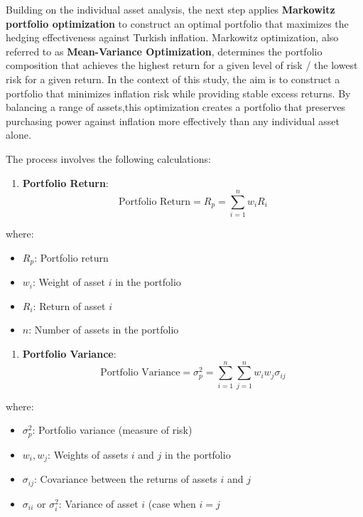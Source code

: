 \documentclass[
]{article}
\providecommand{\tightlist}{%
  \setlength{\itemsep}{0pt}\setlength{\parskip}{0pt}}
\begin{document}
Building on the individual asset analysis, the next step applies
\textbf{Markowitz portfolio optimization} to construct an optimal
portfolio that maximizes the hedging effectiveness against Turkish
inflation. Markowitz optimization, also referred to as
\textbf{Mean-Variance Optimization}, determines the portfolio
composition that achieves the highest return for a given level of risk /
the lowest risk for a given return. In the context of this study, the
aim is to construct a portfolio that minimizes inflation risk while
providing stable excess returns. By balancing a range of assets,this
optimization creates a portfolio that preserves purchasing power against
inflation more effectively than any individual asset alone.

The process involves the following calculations:

\begin{enumerate}
\def\labelenumi{\arabic{enumi}.}
\tightlist
\item
  \textbf{Portfolio Return}: \[
  \text{Portfolio Return} = R_p = \sum_{i=1}^{n} w_i R_i
  \]
\end{enumerate}

where:

\begin{itemize}
\tightlist
\item
  \(R_p\): Portfolio return
\item
  \(w_i\): Weight of asset \(i\) in the portfolio
\item
  \(R_i\): Return of asset \(i\)
\item
  \(n\): Number of assets in the portfolio
\end{itemize}

\begin{enumerate}
\def\labelenumi{\arabic{enumi}.}
\setcounter{enumi}{1}
\tightlist
\item
  \textbf{Portfolio Variance}: \[
  \text{Portfolio Variance} = \sigma_p^2 = \sum_{i=1}^{n} \sum_{j=1}^{n} w_i w_j \sigma_{ij}
  \]
\end{enumerate}

where:

\begin{itemize}
\tightlist
\item
  \(\sigma_p^2\): Portfolio variance (measure of risk)
\item
  \(w_i, w_j\): Weights of assets \(i\) and \(j\) in the portfolio
\item
  \(\sigma_{ij}\): Covariance between the returns of assets \(i\) and
  \(j\)
\item
  \(\sigma_{ii}\) or \(\sigma_i^2\): Variance of asset \(i\) (case when
  \(i = j\)
\end{itemize}
\end{document}
